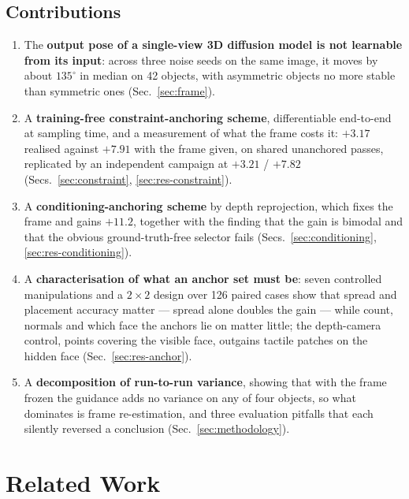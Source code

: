 \documentclass[conference]{IEEEtran}
\begin{document}
\subsection{Contributions}
\begin{enumerate}
  \item The \textbf{output pose of a single-view 3D diffusion model is not learnable
  from its input}: across three noise seeds on the same image, it moves by about
  $135^\circ$ in median on 42 objects, with asymmetric objects no more stable than
  symmetric ones (Sec.~\ref{sec:frame}).
  \item A \textbf{training-free constraint-anchoring scheme}, differentiable
  end-to-end at sampling time, and a measurement of what the frame costs it:
  $+3.17$ realised against $+7.91$ with the frame given, on shared unanchored passes,
  replicated by an independent campaign at $+3.21$ / $+7.82$
  (Secs.~\ref{sec:constraint}, \ref{sec:res-constraint}).
  \item A \textbf{conditioning-anchoring scheme} by depth reprojection, which fixes the
  frame and gains $+11.2$, together with the finding that the gain is bimodal and that
  the obvious ground-truth-free selector fails (Secs.~\ref{sec:conditioning},
  \ref{sec:res-conditioning}).
  \item A \textbf{characterisation of what an anchor set must be}: seven controlled
  manipulations and a $2\times2$ design over 126 paired cases show that spread and
  placement accuracy matter --- spread alone doubles the gain --- while count, normals
  and which face the anchors lie on matter little; the depth-camera control, points
  covering the visible face, outgains tactile patches on the hidden face
  (Sec.~\ref{sec:res-anchor}).
  \item A \textbf{decomposition of run-to-run variance}, showing that with the frame
  frozen the guidance adds no variance on any of four objects, so what dominates is
  frame re-estimation, and three evaluation pitfalls
  that each silently reversed a conclusion (Sec.~\ref{sec:methodology}).
\end{enumerate}

\section{Related Work}
\end{document}
